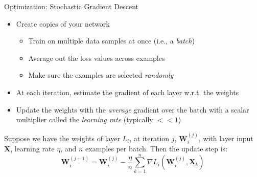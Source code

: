 \documentclass{beamer}
\begin{document}
\begin{frame}{Optimization: Stochastic Gradient Descent}
    \begin{itemize}
        \item Create copies of your network
        \begin{itemize}
            \item Train on multiple data samples at once (i.e., a \textit{batch})
            \item Average out the loss values across examples
            \item Make sure the examples are selected \textit{randomly}
        \end{itemize}
        \item At each iteration, estimate the gradient of each layer w.r.t. the weights
        \item Update the weights with the \textit{average} gradient over the batch with a scalar multiplier called the \textit{learning rate} (typically $<< 1$)
    \end{itemize}

    Suppose we have the weights of layer $L_i$, at iteration $j$, $\bm{W}_i^{(j)}$, with layer input $\bm{X}$, learning rate $\eta$, and $n$ examples per batch. Then the update step is:
    \[
        \bm{W}_i^{(j+1)} = \bm{W}_i^{(j)} - \frac{\eta}{n}\sum_{k=1}^n \nabla L_i(\bm{W}_i^{(j)}, \bm{X}_k)
    \]
\end{frame}
\end{document}
